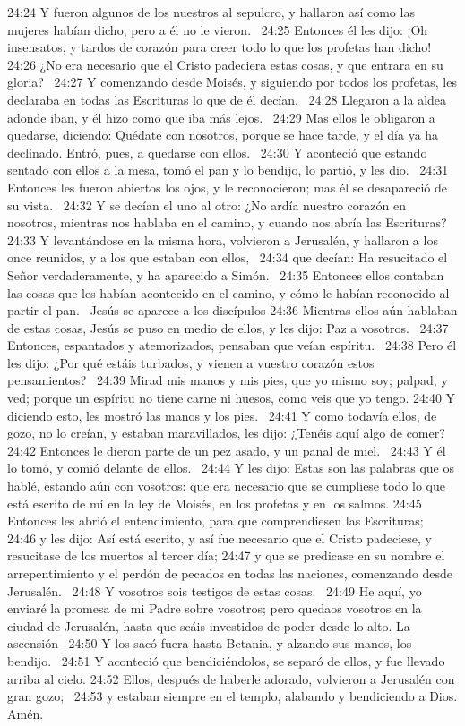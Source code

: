 24:24 Y fueron algunos de los nuestros al sepulcro, y hallaron así como las mujeres habían dicho, pero a él no le vieron.  
24:25 Entonces él les dijo: ¡Oh insensatos, y tardos de corazón para creer todo lo que los profetas han dicho!  
24:26 ¿No era necesario que el Cristo padeciera estas cosas, y que entrara en su gloria?  
24:27 Y comenzando desde Moisés, y siguiendo por todos los profetas, les declaraba en todas las Escrituras lo que de él decían.  
24:28 Llegaron a la aldea adonde iban, y él hizo como que iba más lejos.  
24:29 Mas ellos le obligaron a quedarse, diciendo: Quédate con nosotros, porque se hace tarde, y el día ya ha declinado. Entró, pues, a quedarse con ellos.  
24:30 Y aconteció que estando sentado con ellos a la mesa, tomó el pan y lo bendijo, lo partió, y les dio.  
24:31 Entonces les fueron abiertos los ojos, y le reconocieron; mas él se desapareció de su vista.  
24:32 Y se decían el uno al otro: ¿No ardía nuestro corazón en nosotros, mientras nos hablaba en el camino, y cuando nos abría las Escrituras?  
24:33 Y levantándose en la misma hora, volvieron a Jerusalén, y hallaron a los once reunidos, y a los que estaban con ellos,  
24:34 que decían: Ha resucitado el Señor verdaderamente, y ha aparecido a Simón.  
24:35 Entonces ellos contaban las cosas que les habían acontecido en el camino, y cómo le habían reconocido al partir el pan.  
Jesús se aparece a los discípulos  
24:36 Mientras ellos aún hablaban de estas cosas, Jesús se puso en medio de ellos, y les dijo: Paz a vosotros.  
24:37 Entonces, espantados y atemorizados, pensaban que veían espíritu.  
24:38 Pero él les dijo: ¿Por qué estáis turbados, y vienen a vuestro corazón estos pensamientos?  
24:39 Mirad mis manos y mis pies, que yo mismo soy; palpad, y ved; porque un espíritu no tiene carne ni huesos, como veis que yo tengo. 
24:40 Y diciendo esto, les mostró las manos y los pies.  
24:41 Y como todavía ellos, de gozo, no lo creían, y estaban maravillados, les dijo: ¿Tenéis aquí algo de comer? 
24:42 Entonces le dieron parte de un pez asado, y un panal de miel.  
24:43 Y él lo tomó, y comió delante de ellos.  
24:44 Y les dijo: Estas son las palabras que os hablé, estando aún con vosotros: que era necesario que se cumpliese todo lo que está escrito de mí en la ley de Moisés, en los profetas y en los salmos. 
24:45 Entonces les abrió el entendimiento, para que comprendiesen las Escrituras;  
24:46 y les dijo: Así está escrito, y así fue necesario que el Cristo padeciese, y resucitase de los muertos al tercer día; 
24:47 y que se predicase en su nombre el arrepentimiento y el perdón de pecados en todas las naciones, comenzando desde Jerusalén.  
24:48 Y vosotros sois testigos de estas cosas.  
24:49 He aquí, yo enviaré la promesa de mi Padre sobre vosotros; pero quedaos vosotros en la ciudad de Jerusalén, hasta que seáis investidos de poder desde lo alto. 
La ascensión   
24:50 Y los sacó fuera hasta Betania, y alzando sus manos, los bendijo.  
24:51 Y aconteció que bendiciéndolos, se separó de ellos, y fue llevado arriba al cielo. 
24:52 Ellos, después de haberle adorado, volvieron a Jerusalén con gran gozo;  
24:53 y estaban siempre en el templo, alabando y bendiciendo a Dios. Amén.  
